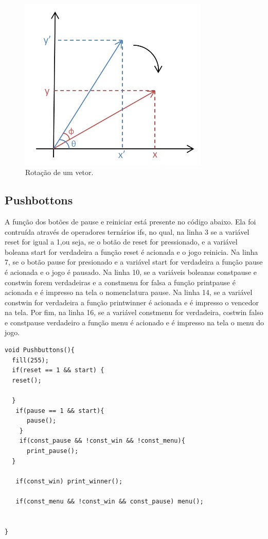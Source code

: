 \documentclass[conference]{IEEEtran}
\newcommand\largurafig{9cm}
\begin{document}
\begin{figure}[htbp]
\centerline{
    \includegraphics[width = \largurafig]{images/rotação_vetor.png}
    }
\caption{Rotação de um vetor.}
\label{fig:rotacao}
\end{figure}

\subsection{Pushbottons}
A função dos botões de pause e reiniciar está presente no código abaixo. 
Ela foi contruída através de operadores ternários ifs, no qual, na linha 3 se a variável reset for igual a 1,ou seja, se o botão de reset for pressionado, e a variável boleana start for verdadeira a função reset é acionada e o jogo reinicia. Na linha 7, se o botão pause for presionado e a variável start for verdadeira a função pause é acionada e o jogo é pausado. Na linha 10, se a variáveis boleanas constpause e constwin forem verdadeiras e a constmenu for falsa a função printpause é acionada e é impresso na tela o nomenclatura pause. Na linha 14, se a variável constwin for verdadeira a função printwinner é acionada e é impresso o vencedor na tela. Por fim, na linha 16, se a variável constmenu for verdadeira, costwin falso e constpause verdadeiro a função menu é acionado e é impresso na tela o menu do jogo.

\begin{lstlisting}
void Pushbuttons(){
  fill(255);
  if(reset == 1 && start) {
  reset();
      
  }
   if(pause == 1 && start){
      pause();
    }
    if(const_pause && !const_win && !const_menu){
      print_pause();
  }
   
   if(const_win) print_winner();
     
   if(const_menu && !const_win && const_pause) menu();

     
}
\end{lstlisting}
\end{document}
